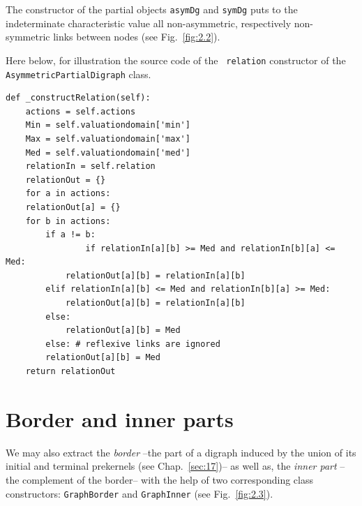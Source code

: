 The constructor of the partial objects \texttt{asymDg} and \texttt{symDg} puts to the indeterminate characteristic value all non-asymmetric, respectively non-symmetric links between nodes (see Fig.~\vref{fig:2.2}).

Here below, for illustration the source code of the \texttt{ relation} constructor of the \texttt{AsymmetricPartialDigraph} class.
\begin{lstlisting}[caption={Computing the asymmetric part of a bipolar-valued relation},label=list:2.4,basicstyle=\ttfamily\scriptsize]
def _constructRelation(self):
    actions = self.actions
    Min = self.valuationdomain['min']
    Max = self.valuationdomain['max']
    Med = self.valuationdomain['med']
    relationIn = self.relation
    relationOut = {}
    for a in actions:
	relationOut[a] = {}
	for b in actions:
	    if a != b:
                if relationIn[a][b] >= Med and relationIn[b][a] <= Med:
		    relationOut[a][b] = relationIn[a][b]
		elif relationIn[a][b] <= Med and relationIn[b][a] >= Med:
		    relationOut[a][b] = relationIn[a][b]
		else:
		    relationOut[a][b] = Med
	    else: # reflexive links are ignored
		relationOut[a][b] = Med
    return relationOut
\end{lstlisting}

\section{Border and inner parts}
\label{sec:2.4}

We may also extract the \emph{border} --the part of a digraph induced by the union of its initial and terminal prekernels (see Chap.~\ref{sec:17})--  as well as, the \emph{inner part} --the complement of the border-- with the help of two corresponding class constructors: \texttt{GraphBorder} and \texttt{GraphInner} (see Fig.~\vref{fig:2.3}).

